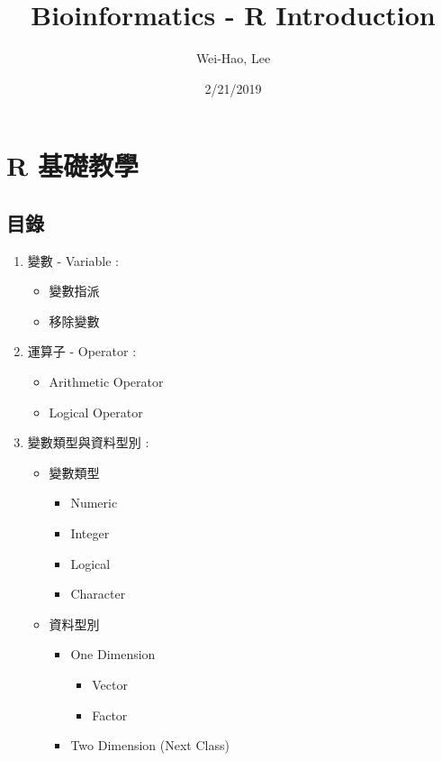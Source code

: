 \documentclass[]{article}
\title{Bioinformatics - R Introduction}
\author{Wei-Hao, Lee}
\date{2/21/2019}
\providecommand{\tightlist}{%
  \setlength{\itemsep}{0pt}\setlength{\parskip}{0pt}}
\begin{document}
\maketitle

\section{R 基礎教學}\label{r-}

\subsection{目錄}

\begin{enumerate}
\def\labelenumi{\arabic{enumi}.}
\tightlist
\item
  變數 - Variable :

  \begin{itemize}
  \tightlist
  \item
    變數指派
  \item
    移除變數
  \end{itemize}
\item
  運算子 - Operator :

  \begin{itemize}
  \tightlist
  \item
    Arithmetic Operator
  \item
    Logical Operator
  \end{itemize}
\item
  變數類型與資料型別 :

  \begin{itemize}
  \tightlist
  \item
    變數類型

    \begin{itemize}
    \tightlist
    \item
      Numeric
    \item
      Integer
    \item
      Logical
    \item
      Character
    \end{itemize}
  \item
    資料型別

    \begin{itemize}
    \tightlist
    \item
      One Dimension

      \begin{itemize}
      \tightlist
      \item
        Vector
      \item
        Factor
      \end{itemize}
    \item
      Two Dimension (Next Class)


\end{itemize}
\end{itemize}
\end{enumerate}
\end{document}
